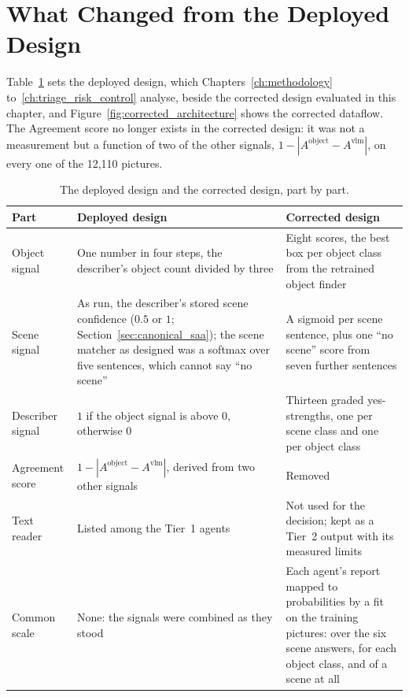 \section{What Changed from the Deployed Design}
\label{sec:what_changed}

Table~\ref{tab:what_changed} sets the deployed design, which Chapters~\ref{ch:methodology} to~\ref{ch:triage_risk_control} analyse, beside the corrected design evaluated in this chapter, and Figure~\ref{fig:corrected_architecture} shows the corrected dataflow. The Agreement score no longer exists in the corrected design: it was not a measurement but a function of two of the other signals, $1 - |A^{\text{object}} - A^{\text{vlm}}|$, on every one of the 12,110 pictures.

\begin{table}[!htbp]
\centering
\caption[The deployed and the corrected design, part by part]{The deployed design and the corrected design, part by part.}
\label{tab:what_changed}
\small
\begin{tabular}{>{\raggedright\arraybackslash}p{2.6cm}>{\raggedright\arraybackslash}p{5.6cm}>{\raggedright\arraybackslash}p{5.6cm}}
\toprule
Part & Deployed design & Corrected design \\
\midrule
Object signal & One number in four steps, the describer's object count divided by three & Eight scores, the best box per object class from the retrained object finder \\
Scene signal & As run, the describer's stored scene confidence ($0.5$ or $1$; Section~\ref{sec:canonical_saa}); the scene matcher as designed was a softmax over five sentences, which cannot say ``no scene'' & A sigmoid per scene sentence, plus one ``no scene'' score from seven further sentences \\
Describer signal & $1$ if the object signal is above $0$, otherwise $0$ & Thirteen graded yes-strengths, one per scene class and one per object class \\
Agreement score & $1 - |A^{\text{object}} - A^{\text{vlm}}|$, derived from two other signals & Removed \\
Text reader & Listed among the Tier~1 agents & Not used for the decision; kept as a Tier~2 output with its measured limits \\
Common scale & None: the signals were combined as they stood & Each agent's report mapped to probabilities by a fit on the training pictures: over the six scene answers, for each object class, and of a scene at all \\

\end{tabular}
\end{table}
